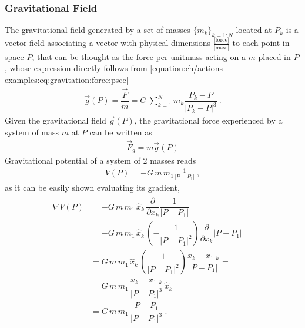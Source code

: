 \documentclass[letterpaper,10pt,english]{jupyterBook}
\begin{document}
\subsubsection{Gravitational Field}
\label{\detokenize{ch/actions-examples:gravitational-field}}\label{\detokenize{ch/actions-examples:classical-mechanics-actions-gravitation-field}}
\sphinxAtStartPar
The gravitational field generated by a set of masses \(\{ m_k \}_{k=1:N}\) located at \(P_k\) is a vector field associating a vector with physical dimensions \(\frac{\text{[force]}}{\text{[mass]}}\) to each point in space \(P\), that can be thought as the force per unit\sphinxhyphen{}mass acting on a  \(m\) placed in \(P\), whose expression directly follows from \eqref{equation:ch/actions-examples:eq:gravitation:force:psce}
\begin{equation*}
\begin{split}\vec{g}(P) = \dfrac{\vec{F}}{m} = G \, \sum_{k=1}^N m_k \dfrac{P_k - P}{|P_k - P|^3} \ .\end{split}
\end{equation*}
\sphinxAtStartPar
Given the gravitational field \(\vec{g}(P)\), the gravitational force experienced by a system of mass \(m\) at \(P\) can be written as
\begin{equation*}
\begin{split}\vec{F}_g = m \vec{g}(P)\end{split}
\end{equation*}
\sphinxAtStartPar
{} Gravitational potential of a system of 2 masses reads
\begin{equation*}
\begin{split}V(P) = - G \, m \, m_1 \frac{1}{|P - P_1|} \ ,\end{split}
\end{equation*}
\sphinxAtStartPar
as it can be easily shown evaluating its gradient,
\begin{equation*}
\begin{split}\begin{aligned}
  \nabla V(P)
  & = - G \, m \, m_1 \, \hat{x}_k \, \dfrac{\partial}{\partial x_k} \dfrac{1}{|P - P_1|} = \\
  & = - G \, m \, m_1 \, \hat{x}_k \, \left( - \dfrac{1}{|P - P_1|^2} \right) \dfrac{\partial}{\partial x_k} |P - P_1| = \\
  & =   G \, m \, m_1 \, \hat{x}_k \, \left(   \dfrac{1}{|P - P_1|^2} \right) \dfrac{x_k - x_{1,k}}{|P - P_1|} = \\
  & =   G \, m \, m_1 \, \dfrac{x_k - x_{1,k}}{|P - P_1|^3}  \, \hat{x}_k= \\
  & =   G \, m \, m_1 \, \dfrac{P-P_1}{|P - P_1|^3} \ .
\end{aligned}\end{split}
\end{equation*}
\end{document}
